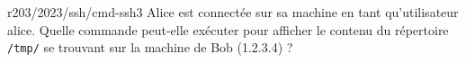 \begin{question}{r203/2023/ssh/cmd-ssh3}
  Alice est connectée sur sa machine en tant qu'utilisateur
  alice. Quelle commande peut-elle exécuter pour afficher le contenu
  du répertoire \texttt{/tmp/} se trouvant sur la machine de Bob
  (1.2.3.4) ?
  \begin{reponses}[3]
    \lastchoices
  \end{reponses}
\end{question}
